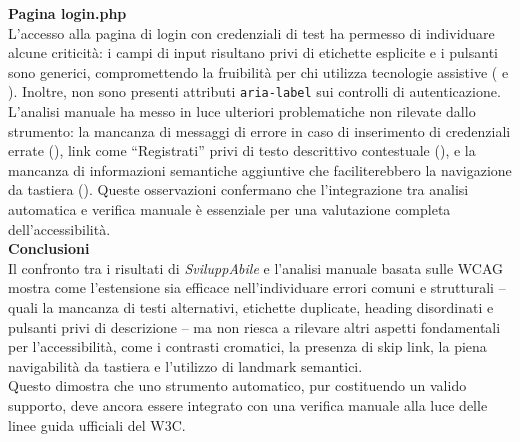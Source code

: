 \noindent \textbf{Pagina login.php}\\
L’accesso alla pagina di login con credenziali di test ha permesso di individuare alcune criticità: i campi di input risultano privi di etichette esplicite e i pulsanti sono generici, compromettendo la fruibilità per chi utilizza tecnologie assistive ({} e {}). Inoltre, non sono presenti attributi \texttt{aria-label} sui controlli di autenticazione.\\
L’analisi manuale ha messo in luce ulteriori problematiche non rilevate dallo strumento: la mancanza di messaggi di errore in caso di inserimento di credenziali errate ({}), link come “Registrati” privi di testo descrittivo contestuale ({}), e la mancanza di informazioni semantiche aggiuntive che faciliterebbero la navigazione da tastiera ({}). Queste osservazioni confermano che l’integrazione tra analisi automatica e verifica manuale è essenziale per una valutazione completa dell’accessibilità.\\

\noindent \textbf{Conclusioni}\\
Il confronto tra i risultati di \textit{SviluppAbile} e l’analisi manuale basata sulle WCAG mostra come l’estensione sia efficace nell’individuare errori comuni e strutturali – quali la mancanza di testi alternativi, etichette duplicate, heading disordinati e pulsanti privi di descrizione – ma non riesca a rilevare altri aspetti fondamentali per l’accessibilità, come i contrasti cromatici, la presenza di skip link, la piena navigabilità da tastiera e l’utilizzo di landmark semantici.\\
Questo dimostra che uno strumento automatico, pur costituendo un valido supporto, deve ancora essere integrato con una verifica manuale alla luce delle linee guida ufficiali del W3C.

